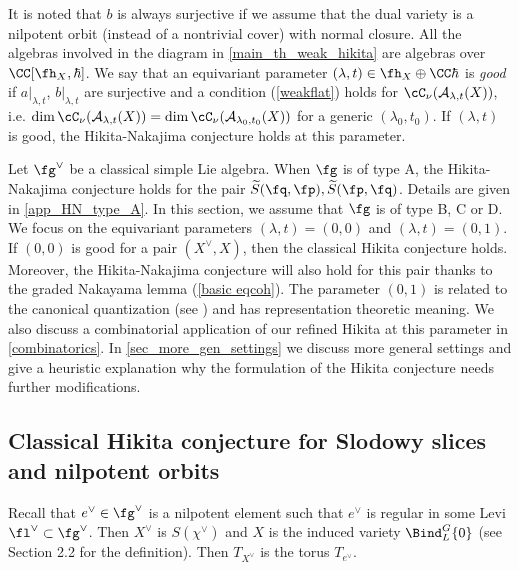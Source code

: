 \documentclass[12pt]{amsart}
\begin{document}

It is noted that $b$ is always surjective if we assume that the dual variety is a nilpotent orbit (instead of a nontrivial cover) with normal closure. %
All the algebras involved in the diagram in \cref{main_th_weak_hikita} are algebras over $\CC[\fh_X,\hbar]$. 
We say that an equivariant parameter $(\lambda, t)\in \fh_X\oplus \CC\hbar$ is \emph{good} if $a|_{\lambda, t}$, $b|_{\lambda,t}$ are surjective 
and a condition (\ref{weakflat}) holds for $\cC_\nu(\mathcal{A}_{\lambda, t}(X))$, i.e. $\dim \cC_\nu(\mathcal{A}_{\lambda, t}(X))=\dim \cC_\nu(\mathcal{A}_{\lambda_0, t_0}(X))$ for a generic $(\lambda_0, t_0)$. If $(\lambda,t)$ is good, the Hikita-Nakajima conjecture holds at this parameter.

Let $\fg^\vee$ be a classical simple Lie algebra. When $\fg$ is of type A, the Hikita-Nakajima conjecture holds for the pair $\widetilde{S}(\fq,\fp), \widetilde{S}(\fp,\fq)$. Details are given in \cref{app_HN_type_A}. In this section, we assume that $\fg$ is of type B, C or D. We focus on the equivariant parameters $(\lambda, t)= (0,0)$ and $(\lambda,t)= (0,1)$. If $(0,0)$ is good for a pair $(X^\vee, X)$, then the classical Hikita conjecture holds. Moreover, the Hikita-Nakajima conjecture will also hold for this pair thanks to the graded Nakayama lemma (\cref{basic eqcoh}). The parameter $(0,1)$ is related to the canonical quantization (see \cite[Section 5]{LMBM}) and has representation theoretic meaning. We also discuss a combinatorial application of our refined Hikita at this parameter in \cref{combinatorics}. In \cref{sec_more_gen_settings} we discuss more general settings and give a heuristic explanation why the formulation of the Hikita conjecture needs further modifications. 

\subsection{Classical Hikita conjecture for Slodowy slices and nilpotent orbits}
Recall that $e^\vee\in \fg^\vee$ is a nilpotent element such that $e^\vee$ is regular in some Levi $\fl^\vee\subset \fg^\vee$. Then $X^\vee$ is $S(\chi^\vee)$ and $X$ is the induced variety $\Bind_{L}^{G}\{0\}$ (see Section 2.2 for the definition). Then $T_{X^\vee}$ is the torus $T_{e^\vee}$. 
\end{document}
